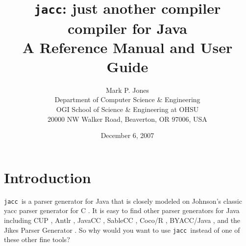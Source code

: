 \documentclass[12pt]{article}
\def\jacc{{\tt jacc}}
\begin{document}
\title{\jacc: just another compiler compiler for Java \\
        A Reference Manual and User Guide}
\author{Mark P. Jones \\
        Department of Computer Science \& Engineering \\
        OGI School of Science \& Engineering at OHSU \\
        20000 NW Walker Road, Beaverton, OR 97006, USA}
\date{December 6, 2007}
\maketitle

\section{Introduction}
\jacc\ is a parser generator for Java \cite{JLS} that is
closely modeled on Johnson's classic yacc parser generator
for C \cite{Johnson:yacc}.  It is easy to find other
parser generators for Java including CUP \cite{CUP}, Antlr
\cite{Antlr}, JavaCC \cite{JavaCC}, SableCC \cite{SableCC},
Coco/R \cite{CocoR}, BYACC/Java \cite{ByaccJava}, and the
Jikes Parser Generator \cite{JikesPG}.  So why would you
want to use \jacc\ instead of one of these other fine tools?
\end{document}
